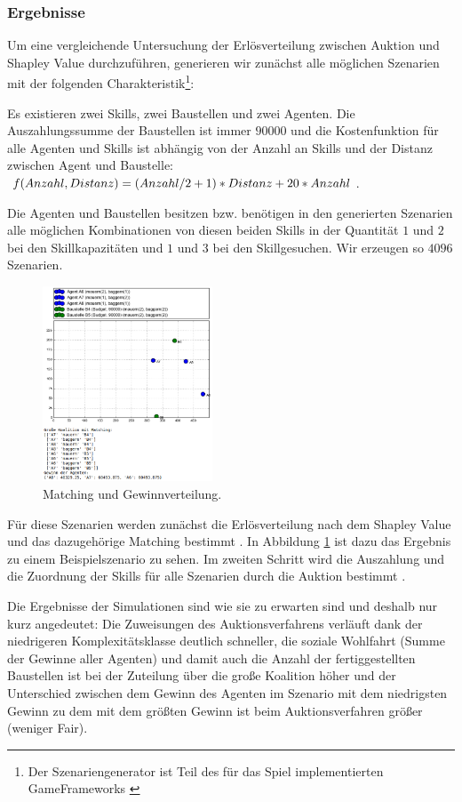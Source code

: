 \subsubsection{Ergebnisse}
Um eine vergleichende Untersuchung der Er\-lös\-ver\-tei\-lung zwischen Auktion und Shapley Value durchzuführen, generieren wir zunächst alle möglichen Szenarien mit der folgenden Charakteristik\footnote{Der Szenariengenerator ist Teil des für das Spiel implementierten GameFrameworks \cite{gitGame}}:

 Es existieren zwei Skills, zwei Baustellen und zwei Agenten. Die Auszahlungssumme der Baustellen ist immer $90000$ und die Kostenfunktion für alle Agenten und Skills ist abhängig von der Anzahl an Skills und der Distanz zwischen Agent und Baustelle: $f(Anzahl, \-Distanz)\- = (Anzahl/2+1)\-*Distanz\-+20*Anzahl$.

Die Agenten und Baustellen besitzen bzw. benötigen in den generierten Szenarien alle möglichen Kombinationen von diesen beiden Skills in der Quantität $1$ und $2$ bei den Skillkapazitäten und $1$ und $3$ bei den Skillgesuchen. Wir erzeugen so $4096$ Szenarien. 

\begin{figure}
  \centering
  \includegraphics[width=0.45\textwidth]{example-shapley-value.png}
  \caption{Matching und Gewinnverteilung.}
  \label{example-shapley-value}
\end{figure}

Für diese Szenarien werden zunächst die Erlösverteilung nach dem Shapley Value und das dazugehörige Matching bestimmt \cite{gitShapley}. In Abbildung \ref{example-shapley-value} ist dazu das Ergebnis zu einem Beispielszenario zu sehen. Im zweiten Schritt wird die Auszahlung und die Zuordnung der Skills für alle Szenarien durch die Auktion bestimmt \cite{gitAuction}.

Die Ergebnisse der Simulationen sind wie sie zu erwarten sind und deshalb nur kurz angedeutet: Die Zuweisungen des Auktionsverfahrens verläuft dank der niedrigeren Komplexitätsklasse deutlich schneller, die soziale Wohlfahrt (Summe der Gewinne aller Agenten) und damit auch die Anzahl der fertiggestellten Baustellen ist bei der Zuteilung über die große Koalition höher und der Unterschied zwischen dem Gewinn des Agenten im Szenario mit dem niedrigsten Gewinn zu dem mit dem größten Gewinn ist beim Auktionsverfahren größer (weniger Fair).

